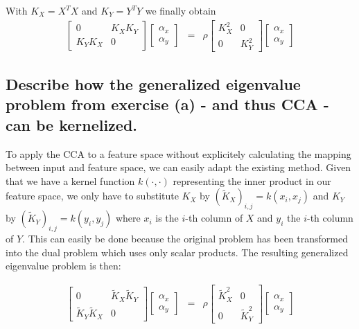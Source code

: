 \documentclass[a4paper, 12pt, titlepage]{article}
\begin{document}
With $K_X = X^TX$ and $K_Y = Y^TY$ we finally obtain
\begin{eqnarray*}
	\begin{bmatrix}
		0 & K_XK_Y\\
		K_YK_X & 0
	\end{bmatrix}
	\begin{bmatrix}
		\alpha_x\\
		\alpha_y
	\end{bmatrix} &=& \rho
	\begin{bmatrix}
		K_X^2 & 0\\
		0 &K_Y^2
	\end{bmatrix}
	\begin{bmatrix}
		\alpha_x\\
		\alpha_y
	\end{bmatrix}
\end{eqnarray*}

\subsection{Describe how the generalized eigenvalue problem from exercise (a) - and thus CCA - can be kernelized.}

To apply the CCA to a feature space without explicitely calculating the mapping between input and feature space, we can easily adapt the existing method.
Given that we have a kernel function $k(\cdot,\cdot)$ representing the inner product in our feature space, we only have to substitute $K_X$ by $(\tilde{K}_X)_{i,j} = k(x_i,x_j)$ and $K_Y$ by $(\tilde{K}_Y)_{i,j} = k(y_i,y_j)$ where $x_i$ is the $i$-th column of $X$ and $y_i$ the $i$-th column of $Y$.
This can easily be done because the original problem has been transformed into the dual problem which uses only scalar products.
The resulting generalized eigenvalue problem is then:

\begin{eqnarray*}
	\begin{bmatrix}
		0 & \tilde{K}_X\tilde{K}_Y\\
		\tilde{K}_Y\tilde{K}_X & 0
	\end{bmatrix}
	\begin{bmatrix}
		\alpha_x\\
		\alpha_y
	\end{bmatrix} &=& \rho
	\begin{bmatrix}
		\tilde{K}_X^2 & 0\\
		0 &\tilde{K}_Y^2
	\end{bmatrix}
	\begin{bmatrix}
		\alpha_x\\
		\alpha_y
	\end{bmatrix}
\end{eqnarray*}
\end{document}

